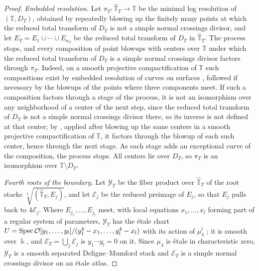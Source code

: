 \begin{proof}
\emph{Embedded resolution.}  Let $\pi_T:\widehat{\mathbb T}_T\to\mathbb T$ be the minimal log
resolution of $(\mathbb T,D_T)$, obtained by repeatedly blowing up the
finitely many points at which the reduced total transform of $D_T$ is
not a simple normal crossings divisor, and let
$E_T=E_1\cup\cdots\cup E_{n_T}$ be the reduced total transform of
$D_T$ in $\widehat{\mathbb T}_T$.  The process stops, and every composition of point
blowups with centers over $\mathbb T$ under which the reduced total transform of
$D_T$ is a simple normal crossings divisor factors through $\pi_T$.
Indeed, on a smooth projective compactification of $\mathbb T$ such compositions
exist by embedded resolution of curves on surfaces
\cite[Thm.~V.3.9]{hartshorne1977}, followed if necessary by the blowups of
the points where three components meet.  If such a composition factors
through a stage of the process, it is not an isomorphism over any
neighborhood of a center of the next step, since the reduced total
transform of $D_T$ is not a simple normal crossings divisor there, so
its inverse is not defined at that center; by
\cite[Prop.~V.5.3]{hartshorne1977}, applied after blowing up the same centers
in a smooth projective compactification of $\mathbb T$, it factors through the blowup
of each such center, hence through the next stage.  As each stage adds an
exceptional curve of the composition, the process stops.  All centers lie
over $D_T$, so $\pi_T$ is an isomorphism over $\mathbb T\setminus D_T$.

\emph{Fourth roots of the boundary.}  Let $\mathcal Y_T$ be the fiber
product over $\widehat{\mathbb T}_T$ of the root stacks $\sqrt[4]{(\widehat{\mathbb T}_T,E_j)}$, and let
$\mathcal E_j$ be the reduced preimage of $E_j$, so that $E_j$ pulls back
to $4\mathcal E_j$.  Where $E_{j_1},\ldots,E_{j_l}$ meet, with local
equations $x_1,\ldots,x_l$ forming part of a regular system of parameters,
$\mathcal Y_T$ has the \'etale chart
$U=\operatorname{Spec}\mathcal O[y_1,\ldots,y_l]/(y_1^4-x_1,\ldots,y_l^4-x_l)$ with its action
of $\mu_4^l$ \cite[Ex.~3.1 and Def.~2.6]{cadman2007}; it is smooth over $\Bbbk$, and
$\mathcal E_T=\bigcup_j\mathcal E_j$ is $y_1\cdots y_l=0$ on it.  Since
$\mu_4$ is \'etale in characteristic zero, $\mathcal Y_T$ is a smooth
separated Deligne--Mumford stack and $\mathcal E_T$ is a simple normal
crossings divisor on an \'etale atlas.


\end{proof}
